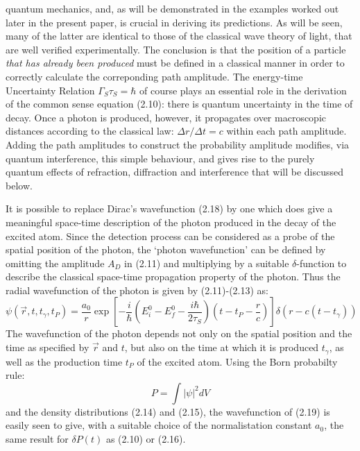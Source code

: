 {   quantum mechanics, and, as will be demonstrated in the examples worked out later in the present
   paper, is  crucial in deriving its predictions. As will be seen, many of the latter are identical
   to those of the classical wave theory of light, that are well verified experimentally.
    The conclusion is that the position
   of a particle {\it that has already been produced} must be defined in a classical manner in order
    to correctly calculate the correponding path amplitude.
     The energy-time Uncertainty Relation $\Gamma_S \tau_S = \hbar$ of course plays an essential
    role in the derivation of the common sense equation (2.10): there is quantum uncertainty
    in the time of decay. Once a photon is produced, however, it propagates over macroscopic
    distances according to the classical law: $\Delta r / \Delta t =c$ within each path amplitude.
    Adding the path amplitudes to construct the probability amplitude modifies, via quantum 
    interference, this simple behaviour, and gives rise to the purely quantum effects of refraction,
    diffraction and interference that will be discussed below.
    \par It is possible to replace Dirac's wavefunction (2.18) by one which does give 
   a meaningful space-time description of the photon produced in the decay of the excited atom. 
     Since the detection process can be considered as a probe of the spatial position of the
    photon, the `photon wavefunction' can be defined by omitting the amplitude $A_D$ in (2.11) 
    and multiplying by a suitable $\delta$-function to describe the classical space-time
    propagation property of the photon. Thus the radial wavefunction of the photon 
    is given by (2.11)-(2.13) as:
  \begin{equation}
  \psi(\vec{r},t,t_{\gamma},t_P) =  \frac{a_0}{r}
   \exp\left[-\frac{i}{\hbar}\left(E_i^0- E_f^0 -\frac{i\hbar}{2\tau_S}\right)
   \left(t-t_P-\frac{r}{c}\right)\right] \delta(r-c(t-t_{\gamma}))
   \end{equation} 
    The wavefunction of the photon  depends not only on the spatial position and the time
    as specified by $\vec{r}$ and $t$, but also on the time at which it is produced $t_{\gamma}$, as well 
   as the production time $t_P$ of the excited atom. Using the Born probabilty rule:
  \[  P = \int |\psi|^2 dV \]
    and the density distributions (2.14) and (2.15), the wavefunction of (2.19) is easily seen to give,
    with a suitable
    choice of the normalistation constant $a_0$, the same result for $\delta P(t)$ as (2.10) or (2.16).

}

